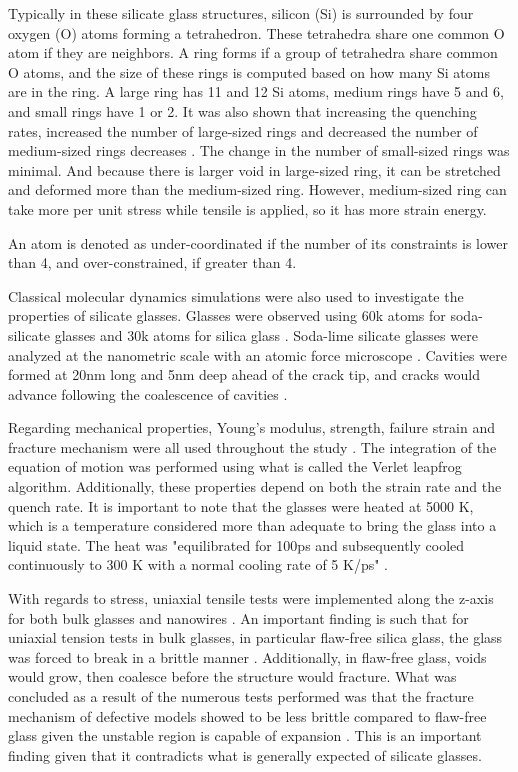 Typically in these silicate glass structures, silicon (Si) is surrounded by four oxygen (O) atoms forming a tetrahedron. These tetrahedra share one common O atom if they are neighbors. A ring forms if a group of tetrahedra share common O atoms, and the size of these rings is computed based on how many Si atoms are in the ring. A large ring has 11 and 12 Si atoms, medium rings have 5 and 6, and small rings have 1 or 2. It was also shown that increasing the quenching rates, increased the number of large-sized rings and decreased the number of medium-sized rings decreases \cite{ebrahem2018influence}. The change in the number of small-sized rings was minimal. And because there is larger void in large-sized ring, it can be stretched and deformed more than the medium-sized ring. However, medium-sized ring can take more per unit stress while tensile is applied, so it has more strain energy.



An atom is denoted as under-coordinated if the number of its constraints is lower than 4, and over-constrained, if greater than 4\cite{pedone2015dynamics}. 

Classical molecular dynamics simulations were also used to investigate the properties of silicate glasses. Glasses were observed using 60k atoms for soda-silicate glasses and 30k atoms for silica glass \cite{pedone2015dynamics}. Soda-lime silicate glasses were analyzed at the nanometric scale with an atomic force microscope \cite{pedone2015dynamics}. Cavities were formed at 20nm long and 5nm deep ahead of the crack tip, and cracks would advance following the coalescence of cavities \cite{pedone2015dynamics}.

Regarding mechanical properties, Young's modulus, strength, failure strain and fracture mechanism were all used throughout the study \cite{pedone2015dynamics}. The integration of the equation of motion was performed using what is called the Verlet leapfrog algorithm. Additionally, these properties depend on both the strain rate and the quench rate. It is important to note that the glasses were heated at 5000 K, which is a temperature considered more than adequate to bring the glass into a liquid state. The heat was "equilibrated for 100ps and subsequently cooled continuously to 300 K with a normal cooling rate of 5 K/ps" \cite{pedone2015dynamics}.

With regards to stress, uniaxial tensile tests were implemented along the z-axis for both bulk glasses and nanowires \cite{pedone2015dynamics}. An important finding is such that for uniaxial tension tests in bulk glasses, in particular flaw-free silica glass, the glass was forced to break in a brittle manner \cite{pedone2015dynamics}. Additionally, in flaw-free glass, voids would grow, then coalesce before the structure would fracture. What was concluded as a result of the numerous tests performed was that the fracture mechanism of defective models showed to be less brittle compared to flaw-free glass given the unstable region is capable of expansion \cite{pedone2015dynamics}. This is an important finding given that it contradicts what is generally expected of silicate glasses.\cite{radialDistribution}



